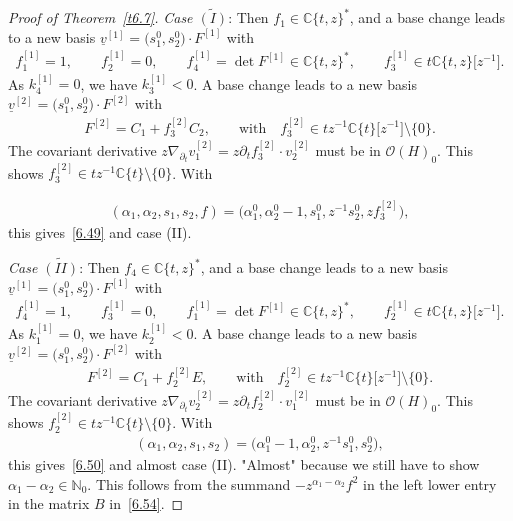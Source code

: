 \documentclass[pdftex]{sigma}%
\numberwithin{equation}{section}
\numberwithin{figure}{section}
\newcommand{\N}{{\mathbb N}}
\newcommand{\C}{{\mathbb C}}
\newcommand{\OO}{{\mathcal O}}
\newcommand{\www}{\widetilde}
\newcommand{\uuuu}{\underline}
\newcommand{\paa}{\partial}
\newcommand{\nnn}{\nabla}
\begin{document}
\begin{proof}[Proof of Theorem~\ref{t6.7}]
\medskip\noindent
{\it Case $\www{(I)}$}: Then $f_1\in\C\{t,z\}^*$, and
a base change leads to a new basis
$\uuuu{v}^{[1]}=\big(s_1^0,s_2^0\big)\cdot F^{[1]}$ with
\begin{gather*}
f_1^{[1]}=1,\qquad f_2^{[1]}=0,
\qquad f_4^{[1]}=\det F^{[1]}\in \C\{t,z\}^*,
\qquad f_3^{[1]}\in t\C\{t,z\}\big[z^{-1}\big].
\end{gather*}
As $k_4^{[1]}=0$, we have $k_3^{[1]}<0$.
A base change leads to a new basis
$\uuuu{v}^{[2]}=\big(s_1^0,s_2^0\big)\cdot F^{[2]}$ with
\begin{gather*}
F^{[2]}=C_1 + f_3^{[2]}C_2, \qquad\text{with}\quad
f_3^{[2]}\in tz^{-1}\C\{t\}\big[z^{-1}\big]\setminus\{0\}.
\end{gather*}
The covariant derivative
$z\nnn_{\paa_t}v_1^{[2]}=z\paa_t f_3^{[2]}\cdot v_2^{[2]}$
must be in $\OO(H)_0$. This shows
$f_3^{[2]}\in tz^{-1}\C\{t\}\allowbreak\setminus\{0\}$. With
{\samepage\begin{gather*}%
(\alpha_1,\alpha_2,s_1,s_2,f)=\big(\alpha_1^0,\alpha_2^0-1,s_1^0,z^{-1}s_2^0,zf_3^{[2]}\big),
\end{gather*}
this gives~\eqref{6.49} and case (II).

}

\medskip\noindent
{\it Case $\www{(II)}$}: Then $f_4\in\C\{t,z\}^*$, and
a base change leads to a new basis
$\uuuu{v}^{[1]}=\big(s_1^0,s_2^0\big)\cdot F^{[1]}$ with
\begin{gather*}
f_4^{[1]}=1,\qquad f_3^{[1]}=0,
\qquad f_1^{[1]}=\det F^{[1]}\in \C\{t,z\}^*,
\qquad f_2^{[1]}\in t\C\{t,z\}\big[z^{-1}\big].
\end{gather*}
As $k_1^{[1]}=0$, we have $k_2^{[1]}<0$.
A base change leads to a new basis
$\uuuu{v}^{[2]}=\big(s_1^0,s_2^0\big)\cdot F^{[2]}$ with
\begin{gather*}
F^{[2]}=C_1 + f_2^{[2]}E, \qquad\text{with}\quad
f_2^{[2]}\in tz^{-1}\C\{t\}\big[z^{-1}\big]\setminus\{0\}.
\end{gather*}
The covariant derivative
$z\nnn_{\paa_t}v_2^{[2]}=z\paa_t f_2^{[2]}\cdot v_1^{[2]}$
must be in $\OO(H)_0$. This shows
$f_2^{[2]}\in tz^{-1}\C\{t\}\allowbreak\setminus\{0\}$. With
\begin{gather*}%
(\alpha_1,\alpha_2,s_1,s_2)=\big(\alpha_1^0-1,\alpha_2^0,z^{-1}s_1^0,s_2^0\big),
\end{gather*}
this gives~\eqref{6.50} and almost case (II).
{}"{}Almost{}"{} because we still have to show
$\alpha_1-\alpha_2\in\N_0$.
This follows from the summand $-z^{\alpha_1-\alpha_2}f^2$ in
the left lower entry in the matrix $B$ in~\eqref{6.54}.



\end{proof}
\end{document}
